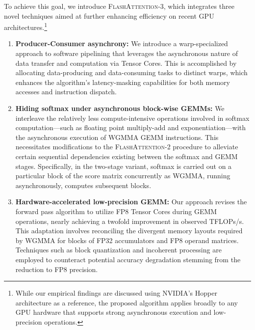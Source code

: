 To achieve this goal, we introduce \textsc{FlashAttention-3}, which integrates three novel techniques aimed at further enhancing efficiency on recent GPU architectures.\footnote{While our empirical findings are discussed using NVIDIA’s Hopper architecture as a reference, the proposed algorithm applies broadly to any GPU hardware that supports strong asynchronous execution and low-precision operations.}

\begin{enumerate}

\item \textbf{Producer-Consumer asynchrony:} We introduce a warp-specialized approach to software pipelining that leverages the asynchronous nature of data transfer and computation via Tensor Cores. This is accomplished by allocating data-producing and data-consuming tasks to distinct warps, which enhances the algorithm’s latency-masking capabilities for both memory accesses and instruction dispatch.

\item \textbf{Hiding softmax under asynchronous block-wise GEMMs:} We interleave the relatively less compute-intensive operations involved in softmax computation—such as floating point multiply-add and exponentiation—with the asynchronous execution of WGMMA GEMM instructions. This necessitates modifications to the \textsc{FlashAttention-2} procedure to alleviate certain sequential dependencies existing between the softmax and GEMM stages. Specifically, in the two-stage variant, softmax is carried out on a particular block of the score matrix concurrently as WGMMA, running asynchronously, computes subsequent blocks.

\item \textbf{Hardware-accelerated low-precision GEMM:} Our approach revises the forward pass algorithm to utilize FP8 Tensor Cores during GEMM operations, nearly achieving a twofold improvement in observed TFLOPs/s. This adaptation involves reconciling the divergent memory layouts required by WGMMA for blocks of FP32 accumulators and FP8 operand matrices. Techniques such as block quantization and incoherent processing are employed to counteract potential accuracy degradation stemming from the reduction to FP8 precision.
\end{enumerate}

